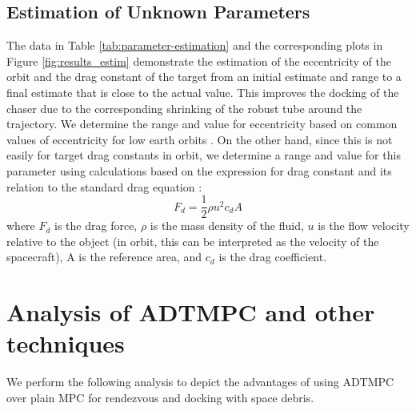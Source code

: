 \subsection{Estimation of Unknown Parameters}
The data in Table \ref{tab:parameter-estimation} and the corresponding plots in Figure \ref{fig:results_estim} demonstrate the estimation of the eccentricity of the orbit and the drag constant of the target from an initial estimate and range to a final estimate that is close to the actual value.
This improves the docking of the chaser due to the corresponding shrinking of the robust tube around the trajectory.
We determine the range and value for eccentricity based on common values of eccentricity for low earth orbits \cite{space2023}.
On the other hand, since this is not easily for target drag constants in orbit, we determine a range and value for this parameter using calculations based on the expression for drag constant and its relation to the standard drag equation \cite{carter2008two,humi2007two}:
\begin{equation}
    F_d=\frac{1}{2}\rho u^2c_dA
\end{equation}
where $F_d$ is the drag force, $\rho$ is the mass density of the fluid, $u$ is the flow velocity relative to the object (in orbit, this can be interpreted as the velocity of the spacecraft), A is the reference area, and $c_d$ is the drag coefficient.

\section{Analysis of ADTMPC and other techniques}
\label{sec:results_analysis}
We perform the following analysis to depict the advantages of using ADTMPC over plain MPC for rendezvous and docking with space debris.
